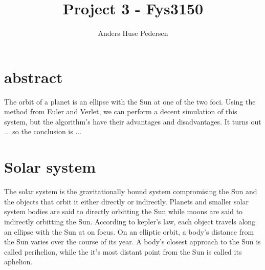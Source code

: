 \documentclass{article}
\title{Project 3 - Fys3150}
\author{Anders Huse Pedersen}
\begin{document}
\section*{abstract}
The orbit of a planet is an ellipse with the Sun at one of the two foci. Using the method from Euler and Verlet, we can perform a decent simulation of this system, but the algorithm's have their advantages and disadvantages. It turns out ... so the conclusion is ...
\section{Solar system}
The solar system is the gravitationally bound system compromising the Sun and the objects that orbit it either directly or indirectly. Planets and smaller solar system bodies are said to directly orbitting the Sun while moons are said to indirectly orbitting the Sun.
According to kepler's law, each object travels along an ellipse with the Sun at on focus. On an elliptic orbit, a body's distance from the Sun varies over the course of its year. A body's closest approach to the Sun is called perihelion, while the it's most distant point from the Sun is called its aphelion.
\end{document}
